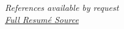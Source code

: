 \documentclass{resume/resume}
\begin{document}
%
%
%
%
\vspace{1.2em}
\begin{center}
    {\em References available by request} \\
    {\em \href{https://www.overleaf.com/read/dpkcngtfrygt}{Full Resumé Source}}
\end{center}
\end{document}
